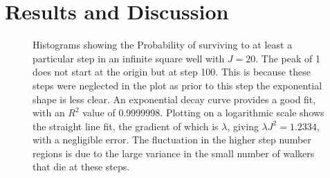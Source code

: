 \documentclass[journal]{IEEEtran}
\begin{document}


\section{Results and Discussion}


\begin{figure}[ht!]
  \centering
  \centering
  \caption{Histograms showing the Probability of surviving to at least a
    particular step in an infinite square well with $J = 20$. The peak of 1 does
    not start at the origin but at step 100. This is because these steps were
    neglected in the plot as prior to this step the exponential shape is less
    clear. An exponential decay curve provides a good fit, with an $R^2$ value
    of 0.9999998. Plotting on a logarithmic scale shows the straight line fit,
    the gradient of which is $\lambda$, giving $\lambda J^2 = 1.2334$, with a
    negligible error. The fluctuation in the higher step number regions is due
    to the large variance in the small number of walkers that die at these
    steps.}
  \label{fig:cumplots}
\end{figure}
\end{document}

